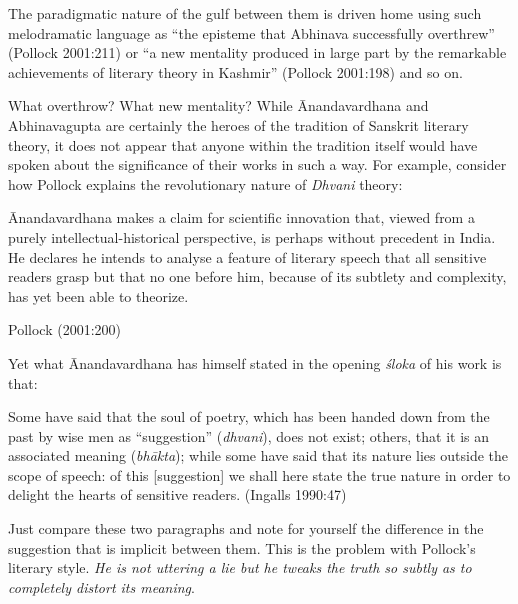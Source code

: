The paradigmatic nature of the gulf between them is driven home using such melodramatic language as ``the episteme that Abhinava successfully overthrew'' (Pollock 2001:211) or ``a new mentality produced in large part by the remarkable achievements of literary theory in Kashmir'' (Pollock 2001:198) and so on. 

What overthrow? What new mentality? While Ānandavardhana and Abhinavagupta are certainly the heroes of the tradition of Sanskrit literary theory, it does not appear that anyone within the tradition itself would have spoken about the significance of their works in such a way. For example, consider how Pollock explains the revolutionary nature of \textsl{Dhvani} theory:  

\begin{myquote}
Ānandavardhana makes a claim for scientific innovation that, viewed from a purely intellectual-historical perspective, is perhaps without precedent in India. He declares he intends to analyse a feature of literary speech that all sensitive readers grasp but that no one before him, because of its subtlety and complexity, has yet been able to theorize. 

\hfill Pollock (2001:200)
\end{myquote}

Yet what Ānandavardhana has himself stated in the opening \textsl{śloka} of his work is that:

\begin{myquote}
Some have said that the soul of poetry, which has been handed down from the past by wise men as ``suggestion'' (\textsl{dhvani}), does not exist; others, that it is an associated meaning (\textsl{bhākta}); while some have said that its nature lies outside the scope of speech: of this [suggestion] we shall here state the true nature in order to delight the hearts of sensitive readers. 
\hfill (Ingalls 1990:47)
\end{myquote}

Just compare these two paragraphs and note for yourself the difference in the suggestion that is implicit between them. This is the problem with Pollock's literary style. \textsl{He is not uttering a lie but he tweaks the truth so subtly as to completely distort its meaning}. 

